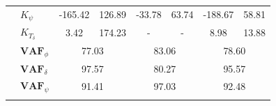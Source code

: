 \begin{table}[]
\begin{tabular}{llcccccc}
                                                   & $K_\psi $                                                          & -165.42                                     & 126.89                                              & -33.78                                      & 63.74                                               & -188.67                                     & 58.81                                               \\
                                                   & $K_{T_\delta}$                                                     & 3.42                                        & 174.23                                              & -                                           & -                                                   & 8.98                                        & 13.88                                               \\ \cline{2-8} 
                                                   & $\mathbf{VAF}_\phi$                                                & \multicolumn{2}{c}{77.03}                                                                         & \multicolumn{2}{c}{83.06}                                                                         & \multicolumn{2}{c}{78.60}                                                                         \\
                                                   & $\mathbf{VAF}_\delta$                                              & \multicolumn{2}{c}{97.57}                                                                         & \multicolumn{2}{c}{80.27}                                                                         & \multicolumn{2}{c}{95.57}                                                                         \\
                                                   & $\mathbf{VAF}_\psi$                                                & \multicolumn{2}{c}{91.41}                                                                         & \multicolumn{2}{c}{97.03}                                                                         & \multicolumn{2}{c}{92.48}                                                                         \\
                                                   &                                                                    & \multicolumn{1}{l}{}                        & \multicolumn{1}{l}{}                                & \multicolumn{1}{l}{}                        & \multicolumn{1}{l}{}                                & \multicolumn{1}{l}{}                        & \multicolumn{1}{l}{}                                \\ \hline

\end{tabular}
\end{table}
